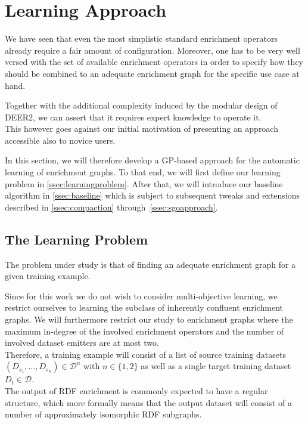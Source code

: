 \section{Learning Approach}
\label{sec:gpapproach}
We have seen that even the most simplistic standard enrichment operators already require a fair amount of configuration.
Moreover, one has to be very well versed with the set of available enrichment operators in order to specify how they should be combined to an adequate enrichment graph for the specific use case at hand.

Together with the additional complexity induced by the modular design of \ac{DEER2}, we can assert that it requires expert knowledge to operate it.\\

This however goes against our initial motivation of presenting an approach accessible also to novice users.

In this section, we will therefore develop a \ac{GP}-based approach for the automatic learning of enrichment graphs.
To that end, we will first define our learning problem in \autoref{ssec:learningproblem}.
After that, we will introduce our baseline algorithm in \autoref{ssec:baseline} which is subject
to subsequent tweaks and extensions described in \autoref{ssec:compaction} through~\ref{ssec:sgoapproach}.

\subsection{The Learning Problem}
\label{ssec:learningproblem}

The problem under study is that of finding an adequate enrichment graph for a given training example.

Since for this work we do not wish to consider multi-objective learning, we restrict ourselves to learning the subclass of inherently confluent enrichment graphs.
We will furthermore restrict our study to enrichment graphs where the maximum in-degree of the involved enrichment operators and the number of involved dataset emitters are at most two. \\

Therefore, a training example will consist of a list of source training datasets $\left(D_{s_1}, \dots, D_{s_n}\right)\in\mathcal{D}^n$ with $n\in\{1,2\}$ as well as a single target training dataset $D_t \in \mathcal{D}$.\\

The output of \ac{RDF} enrichment is commonly expected to have a regular structure, which more formally means that the output dataset will consist of a number of approximately isomorphic \ac{RDF} subgraphs.

